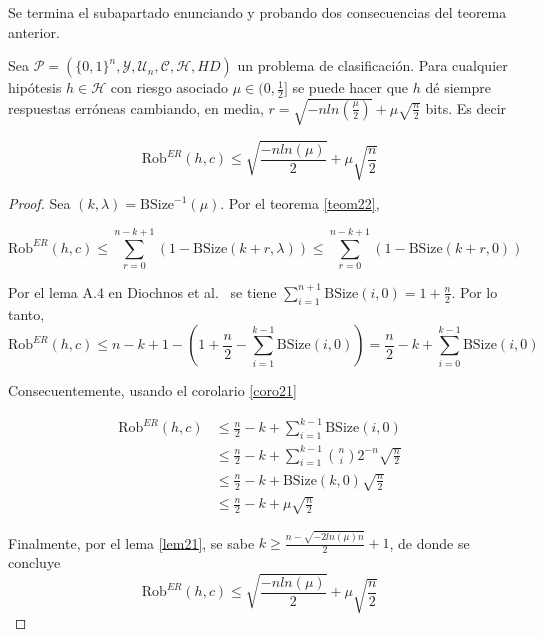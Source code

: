 Se termina el subapartado enunciando y probando dos consecuencias del teorema anterior.

\begin{corolario} \label{coro25}
Sea $\mathcal{P}=(\{0,1\}^n,\mathcal{Y},\mathcal{U}_n,\mathcal{C},\mathcal{H},HD)$ un problema de clasificación. Para cualquier hipótesis $h \in \mathcal{H}$ con riesgo asociado $\mu \in (0,\frac{1}{2}]$ se puede hacer que $h$ dé siempre respuestas erróneas cambiando, en media, $r=\sqrt{-n ln(\frac{\mu}{2})}+\mu\sqrt{\frac{n}{2}}$ bits. Es decir

$$\text{Rob}^{ER}(h,c) \leq \sqrt{\frac{-n ln(\mu)}{2}}+\mu\sqrt{\frac{n}{2}}$$
\end{corolario}

\begin{proof}
Sea $(k,\lambda)=\text{BSize}^{-1}(\mu)$. Por el teorema \ref{teom22}, 

$$\text{Rob}^{ER}(h,c) \leq \sum_{r=0}^{n-k+1} (1-\text{BSize}(k+r,\lambda)) \leq \sum_{r=0}^{n-k+1} (1-\text{BSize}(k+r,0))$$

Por el lema A.4 en Diochnos et al.~\cite{LimitsAdvers} se tiene $\sum_{i=1}^{n+1} \text{BSize}(i,0)=1+\frac{n}{2}$. Por lo tanto, 
$$\text{Rob}^{ER}(h,c) \leq n-k+1 - \left( 1+\frac{n}{2} - \sum_{i=1}^{k-1} \text{BSize}(i,0) \right) = \frac{n}{2}-k+\sum_{i=0}^{k-1} \text{BSize}(i,0)$$

Consecuentemente, usando el corolario \ref{coro21}

\begin{align}
\text{Rob}^{ER}(h,c) &\leq \frac{n}{2}-k+\sum_{i=1}^{k-1} \text{BSize}(i,0) \\
&\leq \frac{n}{2}-k+\sum_{i=1}^{k-1}\binom{n}{i}2^{-n}\sqrt{\frac{n}{2}} \\
&\leq \frac{n}{2}-k+\text{BSize}(k,0)\sqrt{\frac{n}{2}} \\
&\leq \frac{n}{2}-k+\mu\sqrt{\frac{n}{2}}
\end{align}

Finalmente, por el lema \ref{lem21}, se sabe $k \geq \frac{n-\sqrt{-2 ln(\mu)n}}{2}+1$, de donde se concluye 
$$\text{Rob}^{ER}(h,c)\leq \sqrt{\frac{-n ln(\mu)}{2}}+\mu \sqrt{\frac{n}{2}}$$
\end{proof}

